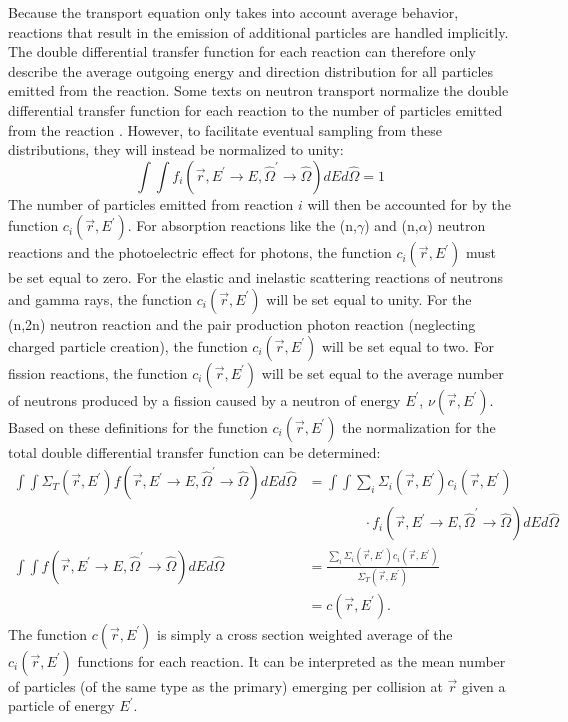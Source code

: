 Because the transport equation only takes into account average behavior, 
reactions that result in the emission of additional particles are handled 
implicitly. The double differential transfer function for each reaction
can therefore only describe the average outgoing energy and direction 
distribution for all particles emitted from the reaction. Some texts on neutron 
transport normalize the double differential transfer function for each reaction 
to the number of particles emitted from the reaction \citep{bell_nuclear_1979}. 
However, to facilitate eventual sampling from these distributions, they will 
instead be normalized to unity:
\begin{equation}
  \int\int f_i(\vec{r},E^{'} \to E,\hat{\Omega}^{'} \to \hat{\Omega})
  dEd\hat{\Omega} = 1
\end{equation}
The number of particles emitted from reaction $i$ will then be accounted for by 
the function $c_i(\vec{r},E^{'})$. For absorption reactions like the 
(n,$\gamma$) and (n,$\alpha$) neutron reactions and the photoelectric effect 
for photons, the function $c_i(\vec{r},E^{'})$ must be set equal to zero. For 
the elastic and inelastic scattering reactions of neutrons and gamma rays, the 
function $c_i(\vec{r},E^{'})$ will be set equal to unity. For the (n,2n) 
neutron reaction and the pair production photon reaction (neglecting charged 
particle creation), the function $c_i(\vec{r},E^{'})$ will be set equal to two. 
For fission reactions, the function $c_i(\vec{r},E^{'})$ will be set equal to 
the average number of neutrons produced by a fission caused by a neutron of 
energy $E^{'}$, $\nu(\vec{r},E^{'})$. Based on these definitions for the 
function $c_i(\vec{r},E^{'})$ the normalization for the total double 
differential transfer function can be determined: 
\begin{align}
  \int\int   \Sigma_T(\vec{r},E^{'})
  f(\vec{r},E^{'} \to E,\hat{\Omega}^{'} \to \hat{\Omega}) 
  dEd\hat{\Omega}
  & = \int\int \sum_i \Sigma_i(\vec{r},E^{'}) c_i(\vec{r},E^{'}) \nonumber \\
  & \qquad \quad \quad \cdot  
  f_i(\vec{r},E^{'} \to E,\hat{\Omega}^{'} \to \hat{\Omega}) 
  dEd\hat{\Omega} \nonumber \\
  \int\int f(\vec{r},E^{'} \to E,\hat{\Omega}^{'} \to \hat{\Omega}) 
  dEd\hat{\Omega} 
  & = \frac{\sum_i \Sigma_i(\vec{r},E^{'}) c_i(\vec{r},E^{'})}
             {\Sigma_T(\vec{r},E^{'})} \nonumber \\
  & = c(\vec{r},E^{'}).
\end{align}
The function $c(\vec{r},E^{'})$ is simply a cross section weighted average of
the $c_i(\vec{r},E^{'})$ functions for each reaction. It can be interpreted as
the mean number of particles (of the same type as the primary) emerging per 
collision at $\vec{r}$ given a particle of energy $E^{'}$.
  
